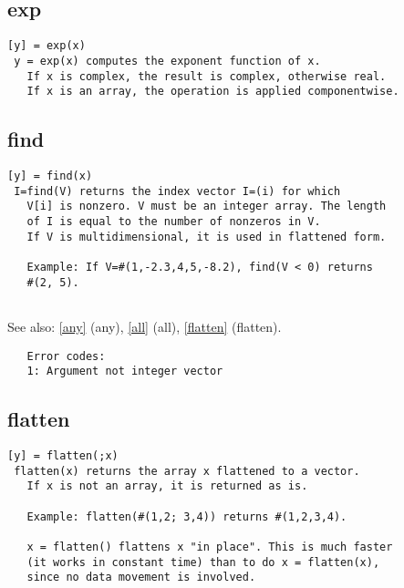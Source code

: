 \documentclass[a4paper]{article}
\begin{document}
\subsection{exp\label{exp}}

\begin{tscreen}
\begin{verbatim}
[y] = exp(x)
 y = exp(x) computes the exponent function of x.
   If x is complex, the result is complex, otherwise real.
   If x is an array, the operation is applied componentwise.
\end{verbatim}
\end{tscreen}



\subsection{find\label{find}}

\begin{tscreen}
\begin{verbatim}
[y] = find(x)
 I=find(V) returns the index vector I=(i) for which
   V[i] is nonzero. V must be an integer array. The length
   of I is equal to the number of nonzeros in V.
   If V is multidimensional, it is used in flattened form.

   Example: If V=#(1,-2.3,4,5,-8.2), find(V < 0) returns
   #(2, 5).
   
\end{verbatim}

See also: \ref{any} {(any)}, \ref{all} {(all)}, \ref{flatten} {(flatten)}.
\begin{verbatim}
   Error codes:
   1: Argument not integer vector 
\end{verbatim}
\end{tscreen}



\subsection{flatten\label{flatten}}

\begin{tscreen}
\begin{verbatim}
[y] = flatten(;x)
 flatten(x) returns the array x flattened to a vector.
   If x is not an array, it is returned as is.

   Example: flatten(#(1,2; 3,4)) returns #(1,2,3,4).
   
   x = flatten() flattens x "in place". This is much faster
   (it works in constant time) than to do x = flatten(x),
   since no data movement is involved. 
\end{verbatim}
\end{tscreen}
\end{document}
